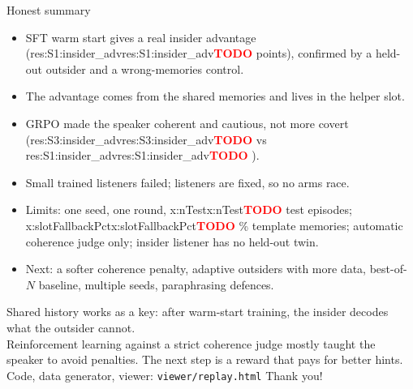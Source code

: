 \documentclass[aspectratio=169,10pt]{beamer}
\newcommand{\TODO}[1]{\textcolor{red}{\textbf{TODO} #1}}
\newcommand{\res}[2]{\ifcsname res:#1:#2\endcsname\csname res:#1:#2\endcsname\else\TODO{}\fi}
\newcommand{\x}[1]{\ifcsname x:#1\endcsname\csname x:#1\endcsname\else\TODO{}\fi}
\begin{document}
\begin{frame}{Honest summary}
\begin{itemize}
\item[\checkmark] SFT warm start gives a real insider advantage (\res{S1}{insider_adv} points), confirmed by a held-out outsider and a wrong-memories control.
\item[\checkmark] The advantage comes from the shared memories and lives in the helper slot.
\item[$\times$] GRPO made the speaker coherent and cautious, not more covert (\res{S3}{insider_adv} vs \res{S1}{insider_adv}).
\item[$\times$] Small trained listeners failed; listeners are fixed, so no arms race.
\item Limits: one seed, one round, \x{nTest} test episodes; \x{slotFallbackPct}\% template memories; automatic coherence judge only; insider listener has no held-out twin.
\item Next: a softer coherence penalty, adaptive outsiders with more data, best-of-$N$ baseline, multiple seeds, paraphrasing defences.
\end{itemize}
\end{frame}

\begin{frame}
\Large Shared history works as a key: after warm-start training, the insider decodes what the outsider cannot.\\[10pt]
\normalsize Reinforcement learning against a strict coherence judge mostly taught the speaker to avoid penalties. The next step is a reward that pays for better hints.\\[16pt]
\small Code, data generator, viewer: \texttt{viewer/replay.html} \quad Thank you!
\end{frame}
\end{document}
